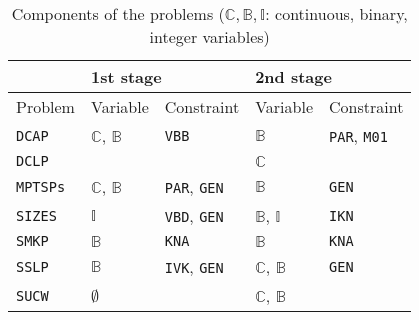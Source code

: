 \begin{table}[H]
	\centering
	\caption{Components of the problems ($\mathbb{C},\mathbb{B},\mathbb{I}$: continuous, binary, integer variables)}
	\label{table:prob_class}
	\begin{tabular}{@{}lllll@{}}
		\toprule
		& \multicolumn{2}{l}{1st stage}                              				  	& \multicolumn{2}{l}{2nd stage}                             			        \\ \midrule
		Problem 	     & Variable                    & Constraint                   	& Variable                    & Constraint                  				    \\ \midrule
		\texttt{DCAP}    & $\mathbb{C}$, $\mathbb{B}$  & \texttt{VBB}                	& $\mathbb{B}$                & \texttt{PAR}, \texttt{M01} 			    		\\
		\texttt{DCLP}	 &							   &								& $\mathbb{C}$			 	  &													\\				
		\texttt{MPTSPs}  & $\mathbb{C}$, $\mathbb{B}$  & \texttt{PAR}, \texttt{GEN}		& $\mathbb{B}$                & \texttt{GEN}               						\\
		\texttt{SIZES}   & $\mathbb{I}$ 			   & \texttt{VBD}, \texttt{GEN} 	& $\mathbb{B}$, $\mathbb{I}$  & \texttt{IKN}             						\\
		\texttt{SMKP}    & $\mathbb{B}$                & \texttt{KNA}                	& $\mathbb{B}$                & \texttt{KNA}              						\\
		\texttt{SSLP}    & $\mathbb{B}$                & \texttt{IVK}, \texttt{GEN} 	& $\mathbb{C}$, $\mathbb{B}$  & \texttt{GEN}             						\\
		\texttt{SUCW}    & $\emptyset$                 &                              	& $\mathbb{C}$, $\mathbb{B}$  &                             					\\ \bottomrule
	\end{tabular}
\end{table}


